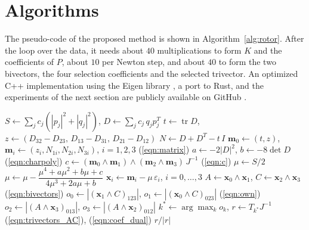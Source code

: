 \documentclass{birkjour}
\theoremstyle{definition}
\theoremstyle{remark}
\numberwithin{equation}{section}
\newcommand{\tr}{\operatorname{tr}}
\begin{document}
\section{Algorithms}
\label{section:algorithms}

The pseudo-code of the proposed method is shown in Algorithm~\ref{alg:rotor}. After the loop over the data, it needs about $40$ multiplications to form $K$ and the coefficients of $P$, about $10$ per Newton step, and about $40$ to form the two bivectors, the four selection coefficients and the selected trivector. An optimized C++ implementation using the Eigen library \cite{Eigen}, a port to Rust, and the experiments of the next section are publicly available on GitHub \cite{GARotorEstimator}.

\begin{algorithm}[t]
\begin{algorithmic}[1]
\STATE $S \leftarrow \sum_j c_j \left(|p_j|^2 + |q_j|^2\right)$, \quad $D \leftarrow \sum_j c_j\, q_j p_j^T$
\STATE $t \leftarrow \tr D$, \quad $z \leftarrow (D_{32} - D_{23},\, D_{13} - D_{31},\, D_{21} - D_{12})$
\STATE $N \leftarrow D + D^T - t\, I$
\STATE $\mathbf m_0 \leftarrow (t, z)$, \quad $\mathbf m_i \leftarrow (z_i, N_{1i}, N_{2i}, N_{3i})$, $i = 1, 2, 3$ \hfill (\ref{eqn:matrix})
\STATE $a \leftarrow -2 |D|^2$, \quad $b \leftarrow -8 \det D$ \hfill (\ref{eqn:charpoly})
\STATE $c \leftarrow (\mathbf m_0 \wedge \mathbf m_1) \wedge (\mathbf m_2 \wedge \mathbf m_3)\, J^{-1}$ \hfill (\ref{eqn:c})
\STATE $\mu \leftarrow S / 2$
\REPEAT
\STATE $\mu \leftarrow \mu - \dfrac{\mu^4 + a \mu^2 + b \mu + c}{4 \mu^3 + 2 a \mu + b}$
\STATE $\mathbf x_i \leftarrow \mathbf m_i - \mu\, \varepsilon_i$, $i = 0, \ldots, 3$
\STATE $A \leftarrow \mathbf x_0 \wedge \mathbf x_1$, \quad $C \leftarrow \mathbf x_2 \wedge \mathbf x_3$ \hfill (\ref{eqn:bivectors})
\STATE $o_0 \leftarrow |(\mathbf x_1 \wedge C)_{123}|$, \quad $o_1 \leftarrow |(\mathbf x_0 \wedge C)_{023}|$ \hfill (\ref{eqn:own})
\STATE $o_2 \leftarrow |(A \wedge \mathbf x_3)_{013}|$, \quad $o_3 \leftarrow |(A \wedge \mathbf x_2)_{012}|$
\STATE $k^* \leftarrow \arg\max_k o_k$, \quad $r \leftarrow T_{k^*} J^{-1}$ \hfill (\ref{eqn:trivectors_AC}), (\ref{eqn:coef_dual})
\RETURN $r / |r|$
\end{algorithmic}
\caption{Robust Rotor Estimation. The result $r / |r|$ is the quaternion $(w, x, y, z)$ of the rotor $R = w + x E_1 + y E_2 + z E_3$.}
\label{alg:rotor}
\end{algorithm}
\end{document}
